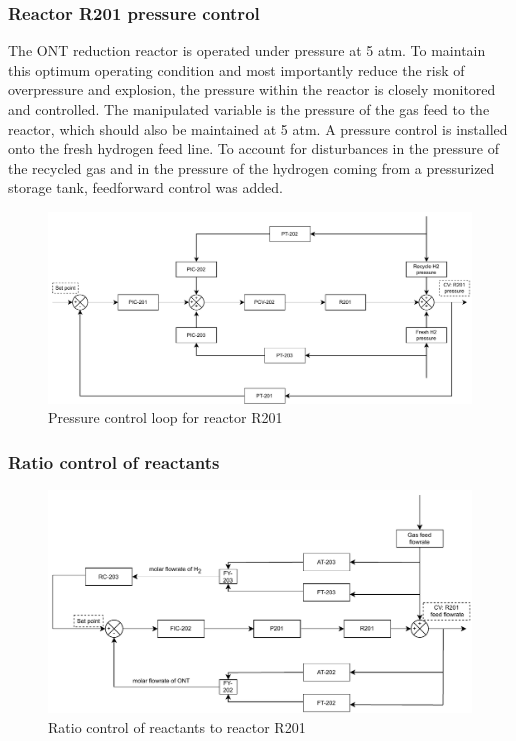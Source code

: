 \subsubsection{Reactor R201 pressure control} %
The ONT reduction reactor is operated under pressure at 5 atm. To maintain this optimum operating condition and most importantly reduce the risk of overpressure and explosion, the pressure within the reactor is closely monitored and controlled. The manipulated variable is the pressure of the gas feed to the reactor, which should also be maintained at 5 atm. A pressure control is installed onto the fresh hydrogen feed line. To account for disturbances in the pressure of the recycled gas and in the pressure of the hydrogen coming from a pressurized storage tank, feedforward control was added. 

\begin{figure}[H]
    \centering
    \includegraphics[width=0.8\linewidth]{chapters/4-operation-control/4-Figures/R201-PC.pdf}
    \caption{Pressure control loop for reactor R201}
    \label{fig:R201-PC}
\end{figure}

\subsubsection{Ratio control of reactants} %


\begin{figure}[H]
    \centering
    \includegraphics[width=0.8\linewidth]{chapters/4-operation-control/4-Figures/R201-FC.pdf}
    \caption{Ratio control of reactants to reactor R201}
    \label{fig:R201-FC}
\end{figure} 

